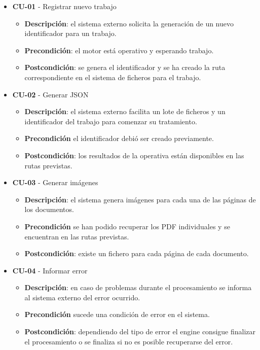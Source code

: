 \begin{itemize}
	\item \textbf{CU-01} - Registrar nuevo trabajo
	\begin{itemize}
		\item \textbf{Descripción}: el sistema externo solicita la generación de un nuevo identificador para un trabajo.
		\item \textbf{Precondición}: el motor está operativo y esperando trabajo.
		\item \textbf{Postcondición}: se genera el identificador y se ha creado la ruta correspondiente en el sistema de ficheros para el trabajo.
	\end{itemize}
\item \textbf{CU-02} - Generar JSON
	\begin{itemize}
		\item \textbf{Descripción}: el sistema externo facilita un lote de ficheros y un identificador del trabajo para comenzar su tratamiento.
		\item \textbf{Precondición} el identificador debió ser creado previamente.
		\item \textbf{Postcondición}: los resultados de la operativa están disponibles en las rutas previstas.
\end{itemize}
\item \textbf{CU-03} - Generar imágenes
	\begin{itemize}
		\item \textbf{Descripción}: el sistema genera imágenes para cada una de las páginas de los documentos.
		\item \textbf{Precondición} se han podido recuperar los PDF individuales y se encuentran en las rutas previstas.
		\item \textbf{Postcondición}: existe un fichero para cada página de cada documento.
\end{itemize}
\item \textbf{CU-04} - Informar error
	\begin{itemize}
		\item \textbf{Descripción}: en caso de problemas durante el procesamiento se informa al sistema externo del error ocurrido.
		\item \textbf{Precondición} sucede una condición de error en el sistema.
		\item \textbf{Postcondición}: dependiendo del tipo de error el engine consigue finalizar el procesamiento o se finaliza si no es posible recuperarse del error.
\end{itemize}

\end{itemize}
